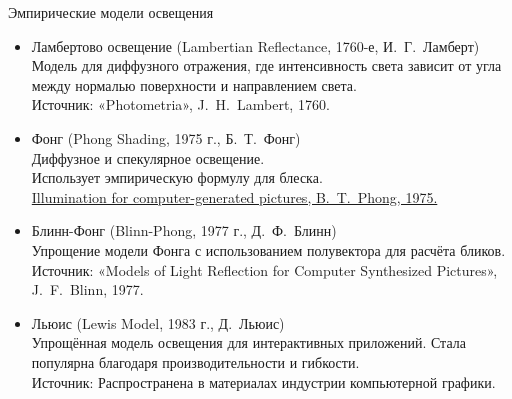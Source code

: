 \documentclass{beamer}
\begin{document}
	
	\begin{frame}{Эмпирические модели освещения}

		\footnotesize

		\begin{itemize}
			\item 
			Ламбертово освещение (Lambertian Reflectance, 1760-е, И.~Г.~Ламберт)\\
			Модель для диффузного отражения, где интенсивность света зависит от угла между нормалью поверхности и направлением света.\\
			{Источник:} «Photometria», J.~H.~Lambert, 1760.

			\item 
			Фонг (Phong Shading, 1975 г., Б.~Т.~Фонг)\\
			Диффузное и спекулярное освещение.\\
			Использует эмпирическую формулу для блеска.\\
			\href{https://users.cs.northwestern.edu/~ago820/cs395/Papers/Phong_1975.pdf}{Illumination for computer-generated pictures, B.~T.~Phong, 1975.}

			\item 
			Блинн-Фонг (Blinn-Phong, 1977 г., Д.~Ф.~Блинн)\\
			Упрощение модели Фонга с использованием полувектора для расчёта бликов.\\
			{Источник:} «Models of Light Reflection for Computer Synthesized Pictures», J.~F.~Blinn, 1977.

			\item 
			Льюис (Lewis Model, 1983 г., Д.~Льюис)\\
			Упрощённая модель освещения для интерактивных приложений. Стала популярна благодаря производительности и гибкости.\\
			{Источник:} Распространена в материалах индустрии компьютерной графики.

		\end{itemize}

\end{frame}
\end{document}
